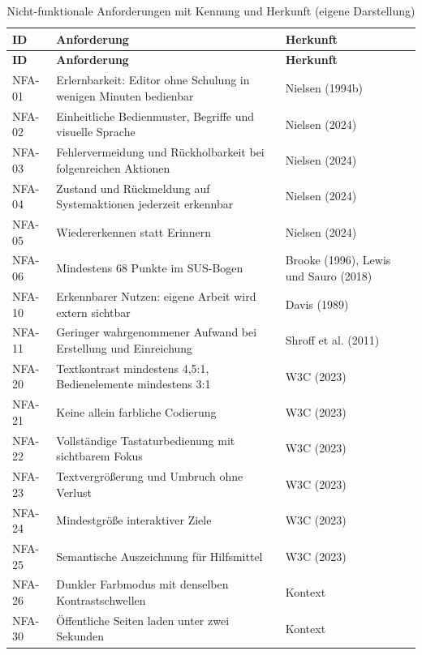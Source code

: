 \begingroup
\footnotesize
\setlength{\tabcolsep}{4pt}
\renewcommand{\arraystretch}{1.05}
\setlength{\LTcapwidth}{\textwidth}
\begin{longtable}{@{}L{1.4cm}L{9.6cm}L{3.5cm}@{}}
	\caption[Nicht-funktionale Anforderungen mit Kennung und Herkunft]{Nicht-funktionale Anforderungen mit Kennung und Herkunft (eigene Darstellung)}
	\label{tab:nfa}\\
	\toprule
	\textbf{ID} & \textbf{Anforderung} & \textbf{Herkunft} \\
	\midrule
	\endfirsthead
	\toprule
	\textbf{ID} & \textbf{Anforderung} & \textbf{Herkunft} \\
	\midrule
	\endhead
	\bottomrule
	\endfoot
	NFA-01 & Erlernbarkeit: Editor ohne Schulung in wenigen Minuten bedienbar & Nielsen (1994b) \\
	NFA-02 & Einheitliche Bedienmuster, Begriffe und visuelle Sprache & Nielsen (2024) \\
	NFA-03 & Fehlervermeidung und Rückholbarkeit bei folgenreichen Aktionen & Nielsen (2024) \\
	NFA-04 & Zustand und Rückmeldung auf Systemaktionen jederzeit erkennbar & Nielsen (2024) \\
	NFA-05 & Wiedererkennen statt Erinnern & Nielsen (2024) \\
	NFA-06 & Mindestens 68 Punkte im SUS-Bogen & Brooke (1996), Lewis und Sauro (2018) \\
	NFA-10 & Erkennbarer Nutzen: eigene Arbeit wird extern sichtbar & Davis (1989) \\
	NFA-11 & Geringer wahrgenommener Aufwand bei Erstellung und Einreichung & Shroff et al. (2011) \\
	NFA-20 & Textkontrast mindestens 4,5:1, Bedienelemente mindestens 3:1 & W3C (2023) \\
	NFA-21 & Keine allein farbliche Codierung & W3C (2023) \\
	NFA-22 & Vollständige Tastaturbedienung mit sichtbarem Fokus & W3C (2023) \\
	NFA-23 & Textvergrößerung und Umbruch ohne Verlust & W3C (2023) \\
	NFA-24 & Mindestgröße interaktiver Ziele & W3C (2023) \\
	NFA-25 & Semantische Auszeichnung für Hilfsmittel & W3C (2023) \\
	NFA-26 & Dunkler Farbmodus mit denselben Kontrastschwellen & Kontext \\
	NFA-30 & Öffentliche Seiten laden unter zwei Sekunden & Kontext \\

\end{longtable}
